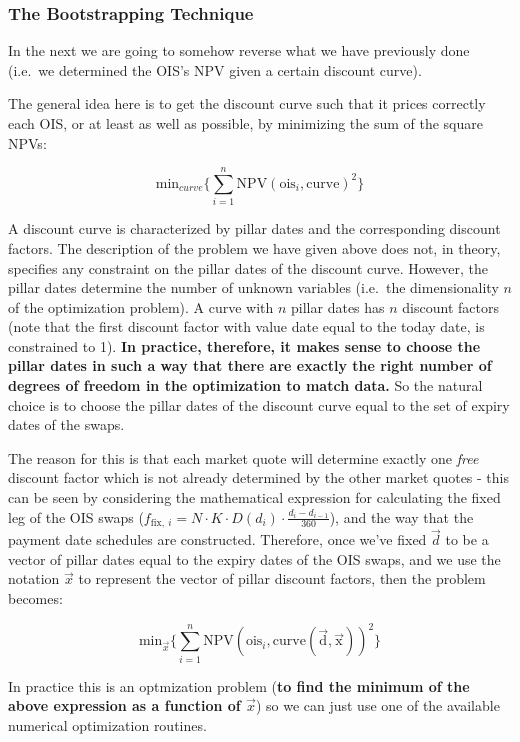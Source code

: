 \documentclass[11pt]{article}
\begin{document}
    \hypertarget{the-bootstrapping-technique}{%
\subsubsection{The Bootstrapping
Technique}\label{the-bootstrapping-technique}}

In the next we are going to somehow reverse what we have previously done
(i.e.~we determined the OIS's NPV given a certain discount curve).

The general idea here is to get the discount curve such that it prices
correctly each OIS, or at least as well as possible, by minimizing the
sum of the square NPVs:

\[\mathrm{min}_{curve} \Big\{\sum_{i=1}^{n}\mathrm{NPV}(\mathrm{ois}_i, \mathrm{curve})^2\Big\}\]

A discount curve is characterized by pillar dates and the corresponding
discount factors. The description of the problem we have given above
does not, in theory, specifies any constraint on the pillar dates of the
discount curve. However, the pillar dates determine the number of
unknown variables (i.e.~the dimensionality \(n\) of the optimization
problem). A curve with \(n\) pillar dates has \(n\) discount factors
(note that the first discount factor with value date equal to the today
date, is constrained to 1). \textbf{In practice, therefore, it makes
sense to choose the pillar dates in such a way that there are exactly
the right number of degrees of freedom in the optimization to match
data.} So the natural choice is to choose the pillar dates of the
discount curve equal to the set of expiry dates of the swaps.

The reason for this is that each market quote will determine exactly one
\emph{free} discount factor which is not already determined by the other
market quotes - this can be seen by considering the mathematical
expression for calculating the fixed leg of the OIS swaps
(\(f_{\mathrm{fix},~i}=N\cdot K\cdot D(d_i)\cdot\frac{d_i - d_{i-1}}{360}\)),
and the way that the payment date schedules are constructed. Therefore,
once we've fixed \(\vec{d}\) to be a vector of pillar dates equal to the
expiry dates of the OIS swaps, and we use the notation \(\vec{x}\) to
represent the vector of pillar discount factors, then the problem
becomes:

\[\mathrm{min}_{\vec{x}} \Big\{\sum_{i=1}^{n}\mathrm{NPV}(\mathrm{ois}_i, \mathrm{curve(\vec{d}, \vec{x})})^2\Big\}\]

In practice this is an optmization problem (\textbf{to find the minimum
of the above expression as a function of \(\vec{x}\)}) so we can just
use one of the available numerical optimization routines.
\end{document}
